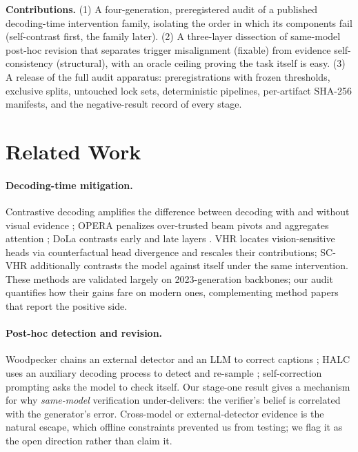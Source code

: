 \documentclass[11pt]{article}
\newcommand{\vhr}{VHR}
\newcommand{\scvhr}{SC-VHR}
\begin{document}
\textbf{Contributions.}
(1) A four-generation, preregistered audit of a published decoding-time intervention family, isolating the order in which its components fail (self-contrast first, the family later).
(2) A three-layer dissection of same-model post-hoc revision that separates trigger misalignment (fixable) from evidence self-consistency (structural), with an oracle ceiling proving the task itself is easy.
(3) A release of the full audit apparatus: preregistrations with frozen thresholds, exclusive splits, untouched lock sets, deterministic pipelines, per-artifact SHA-256 manifests, and the negative-result record of every stage.

\section{Related Work}
\label{sec:related}

\paragraph{Decoding-time mitigation.}
Contrastive decoding amplifies the difference between decoding with and without visual evidence \citep{leng2024vcd}; OPERA penalizes over-trusted beam pivots and aggregates attention \citep{huang2024opera}; DoLa contrasts early and late layers \citep{chuang2024dola}. \vhr{} \citep{vhr2025} locates vision-sensitive heads via counterfactual head divergence and rescales their contributions; \scvhr{} additionally contrasts the model against itself under the same intervention. These methods are validated largely on 2023-generation backbones; our audit quantifies how their gains fare on modern ones, complementing method papers that report the positive side.

\paragraph{Post-hoc detection and revision.}
Woodpecker chains an external detector and an LLM to correct captions \citep{yin2024woodpecker}; HALC uses an auxiliary decoding process to detect and re-sample \citep{chen2024halc}; self-correction prompting asks the model to check itself. Our stage-one result gives a mechanism for why \emph{same-model} verification under-delivers: the verifier's belief is correlated with the generator's error. Cross-model or external-detector evidence is the natural escape, which offline constraints prevented us from testing; we flag it as the open direction rather than claim it.
\end{document}

